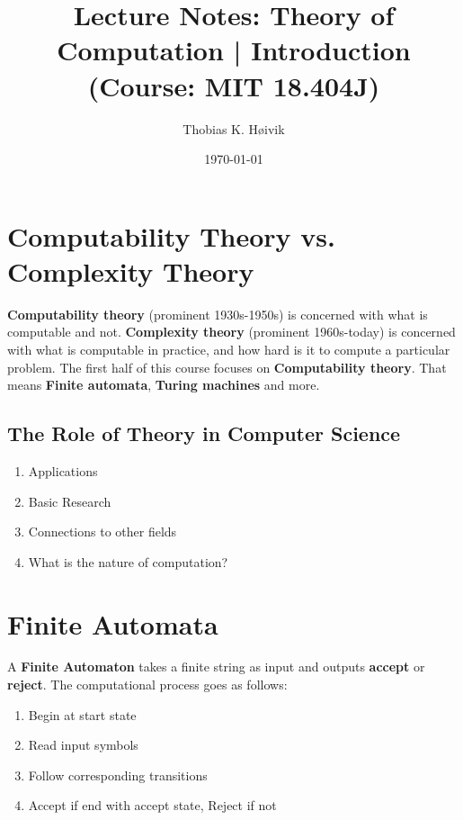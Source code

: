 \documentclass[12pt]{article}
\title{Lecture Notes: Theory of Computation | Introduction (Course: MIT 18.404J)}
\author{Thobias K. Høivik}
\date{\today}
\begin{document}
\maketitle
\section*{Computability Theory vs. Complexity Theory}
\textbf{Computability theory} (prominent 1930s-1950s) is concerned with 
what is computable and not. 
\textbf{Complexity theory} (prominent 1960s-today) is concerned with what is computable 
in practice, and how hard is it to compute a particular problem. 
The first half of this course focuses on \textbf{Computability theory}.  
That means \textbf{Finite automata}, \textbf{Turing machines} and more.

\subsection*{The Role of Theory in Computer Science}  
\begin{enumerate}
    \item Applications 
    \item Basic Research 
    \item Connections to other fields 
    \item What is the nature of computation?
\end{enumerate}

\section*{Finite Automata}

\noindent 
A \textbf{Finite Automaton} takes a finite string as input and outputs \textbf{accept} 
or \textbf{reject}. The computational process goes as follows: 
\begin{enumerate}
    \item Begin at start state 
    \item Read input symbols 
    \item Follow corresponding transitions 
    \item Accept if end with accept state, Reject if not 
\end{enumerate}
\end{document}
